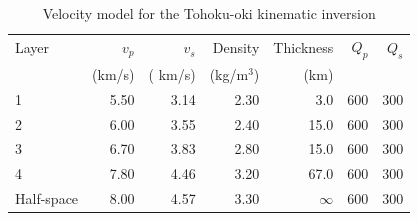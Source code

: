 \begin{table}
\caption{Velocity model for the Tohoku-oki kinematic inversion}
\label{tb_toku_model}
\begin{tabular}{l r r r r r r}
\hline
Layer & $v_p$ & $v_s$ &Density&Thickness&$Q_p$&$Q_s$\\
 & (km/s) &( km/s) & (kg/m$^{3}$) & (km) &  &\\
\hline
1 & 5.50 & 3.14 & 2.30 & 3.0 & 600 & 300\\
2 & 6.00 & 3.55 & 2.40 & 15.0 & 600 & 300\\
3 & 6.70 & 3.83 & 2.80 & 15.0 & 600 & 300\\
4 & 7.80 & 4.46 & 3.20 & 67.0 & 600 & 300\\
Half-space & 8.00 & 4.57 & 3.30 & $\infty$ & 600 & 300\\
\hline
\end{tabular}
\end{table}

